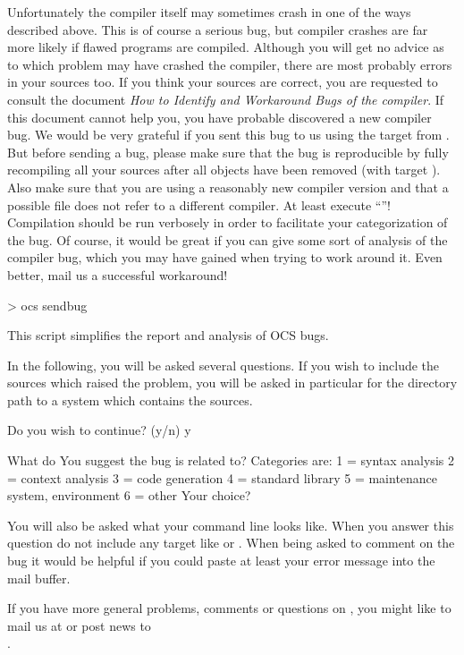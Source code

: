 Unfortunately the \opal{} compiler itself may sometimes crash in one of the ways
described above. This is of course a serious bug, but compiler crashes are far
more likely if flawed programs are compiled. Although you will get no 
advice as to which problem may have crashed the compiler, there are
most probably errors in your sources too. If you think your sources are
correct, you are requested to consult the document {\em How to Identify and
Workaround Bugs of the \opal{} compiler}. If this document cannot help you,
you have probable discovered a new compiler bug. We would be very
grateful if you sent this bug to us using the  target from
. But before sending a bug, please make sure that the bug is
reproducible by 
fully recompiling all your sources after all objects have been removed (with
target ). Also make sure that you are using a reasonably
new compiler version and that a possible  file does not
refer to 
a different compiler. At least execute ``''! Compilation
should be run verbosely  in order to facilitate your categorization
of the bug.
Of course, it would be great if you can give some sort of analysis of the
compiler 
bug, which you may have gained when trying to work around it. Even better,
mail us a successful workaround!

\begin{prog}
> ocs sendbug

This script simplifies the report and analysis of OCS bugs.

In the following, you will be asked several questions. If you
wish to include the sources which raised the problem, you
will be asked in particular for the directory path to a
system which contains the sources.


Do you wish to continue? (y/n) y

What do You suggest the bug is related to?
Categories are:
 1 = syntax analysis
 2 = context analysis
 3 = code generation
 4 = standard library
 5 = maintenance system, environment
 6 = other
Your choice? 
\end{prog}
You will also be asked what your  command line looks like. 
When you answer this question do not include any target like  or . When being asked to comment on the bug it would be
helpful 
if you could paste at least your error message into the mail buffer.
 
If you have more general problems, comments or questions on \opal{},
you might like to mail us at  or post news
to \\ . 


